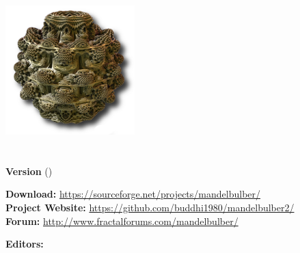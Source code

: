 \begin{titlepage}
	\begin{center}
		\vspace{1.5cm}
			\includegraphics[width=5cm]{img/mandelbulber_logo.png} \\
		\vspace{0.5cm}
		\Huge\textbf{\mTitle}\\
		\Huge\mSubtitle\\
		\vspace{1.5cm}
		\large\textbf{Version \mVersionDocument} (\mDateDocument)\\
		\vspace{1.5cm}
	\end{center}
	\normalsize
	\begin{flushleft}
                        \hspace{3cm} \textbf{Download:}         \hfill \url{https://sourceforge.net/projects/mandelbulber/}\\
                        \hspace{3cm} \textbf{Project Website:}  \hfill \url{https://github.com/buddhi1980/mandelbulber2/}\\
                        \hspace{3cm} \textbf{Forum:}            \hfill \url{http://www.fractalforums.com/mandelbulber/}\\
	\end{flushleft}
	\vspace{2cm}
	\textbf{Editors:}\\
	\mAuthor\\
	\vfill
\end{titlepage}

\setcounter{page}{1}
\tableofcontents
\newpage










\newpage

\lstlistoflistings

\listoffigures


\printindex



\grid
